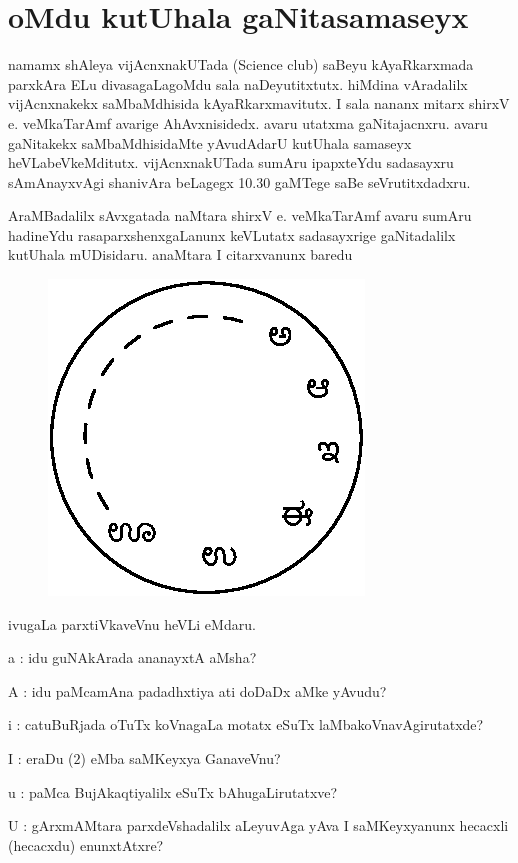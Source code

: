 \chapter{oMdu kutUhala gaNitasamaseyx}

namamx shAleya vijAcnxnakUTada ({\rm Science club})  saBeyu kAyaRkarxmada parxkAra ELu divasagaLagoMdu sala naDeyutitxtutx. hiMdina vAradalilx vijAcnxnakekx saMbaMdhisida kAyaRkarxmavitutx. I sala nananx mitarx shirxV e. veMkaTarAmf avarige AhAvxnisidedx. avaru utatxma gaNitajacnxru. avaru gaNitakekx saMbaMdhisidaMte yAvudAdarU kutUhala samaseyx heVLabeVkeMditutx. vijAcnxnakUTada sumAru ipapxteYdu sadasayxru sAmAnayxvAgi shanivAra beLagegx {\rm 10.30} gaMTege saBe seVrutitxdadxru.

AraMBadalilx sAvxgatada naMtara shirxV e. veMkaTarAmf avaru sumAru hadineYdu rasaparxshenxgaLanunx keVLutatx sadasayxrige gaNitadalilx kutUhala mUDisidaru. anaMtara I citarxvanunx baredu
\begin{figure}[H]
\centering
\includegraphics{src/figures/fig6.eps}
\end{figure}

ivugaLa parxtiVkaveVnu heVLi eMdaru.

a :  idu guNAkArada ananayxtA aMsha?

A :  idu paMcamAna padadhxtiya ati doDaDx aMke yAvudu?

i : catuBuRjada oTuTx koVnagaLa motatx eSuTx laMbakoVnavAgirutatxde?

I :  eraDu ($2$) eMba saMKeyxya GanaveVnu?

u :  paMca BujAkaqtiyalilx eSuTx bAhugaLirutatxve?

U :  gArxmAMtara parxdeVshadalilx aLeyuvAga yAva I saMKeyxyanunx hecacxli (hecacxdu) enunxtAtxre?

